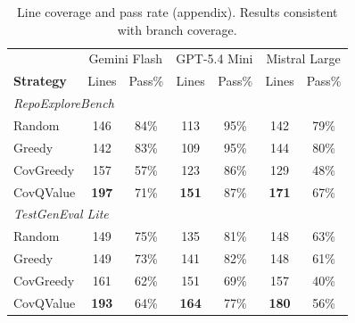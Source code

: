 \begin{table}[t]
\centering
\caption{Line coverage and pass rate (appendix). Results consistent with branch coverage.}
\label{tab:lines}
\small
\begin{tabular}{l|cc|cc|cc}
\toprule
 & \multicolumn{2}{c|}{Gemini Flash} & \multicolumn{2}{c|}{GPT-5.4 Mini} & \multicolumn{2}{c}{Mistral Large} \\
\textbf{Strategy} & Lines & Pass\% & Lines & Pass\% & Lines & Pass\% \\
\midrule
\multicolumn{7}{l}{\textit{RepoExploreBench}} \\
\quad Random & 146 & 84\% & 113 & 95\% & 142 & 79\% \\
\quad Greedy & 142 & 83\% & 109 & 95\% & 144 & 80\% \\
\quad CovGreedy & 157 & 57\% & 123 & 86\% & 129 & 48\% \\
\quad CovQValue & \textbf{197} & 71\% & \textbf{151} & 87\% & \textbf{171} & 67\% \\
\midrule
\multicolumn{7}{l}{\textit{TestGenEval Lite}} \\
\quad Random & 149 & 75\% & 135 & 81\% & 148 & 63\% \\
\quad Greedy & 149 & 73\% & 141 & 82\% & 148 & 61\% \\
\quad CovGreedy & 161 & 62\% & 151 & 69\% & 157 & 40\% \\
\quad CovQValue & \textbf{193} & 64\% & \textbf{164} & 77\% & \textbf{180} & 56\% \\
\bottomrule
\end{tabular}
\end{table}